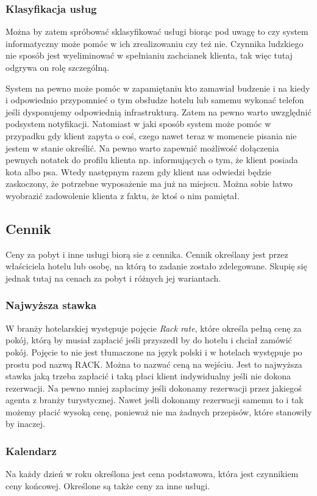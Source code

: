 \documentclass[12pt, a4paper]{article}
\begin{document}
\subsubsection{Klasyfikacja usług}
Można by zatem spróbować sklasyfikować usługi biorąc pod uwagę to czy system
informatyczny może pomóc w ich zrealizowaniu czy też nie. Czynnika ludzkiego
nie sposób jest wyeliminować w spełnianiu zachcianek klienta, tak więc tutaj
odgrywa on rolę szczególną.

System na pewno może pomóc w zapamiętaniu kto zamawiał budzenie i na kiedy i
odpowiednio przypomnieć o tym obsłudze hotelu lub samemu wykonać telefon jeśli
dysponujemy odpowiednią infrastrukturą. Zatem na pewno warto uwzględnić
podsystem notyfikacji. Natomiast w jaki sposób system może pomóc w przypadku gdy
klient zapyta o coś, czego nawet teraz w momencie pisania nie jestem w stanie
określić. Na pewno warto zapewnić możliwość dołączenia pewnych notatek do
profilu klienta np. informujących o tym, że klient posiada kota albo psa. Wtedy
następnym razem gdy klient nas odwiedzi będzie zaskoczony, że potrzebne
wyposażenie ma już na miejscu. Można sobie łatwo wyobrazić zadowolenie klienta z
faktu, że ktoś o nim pamiętał. 

\subsection{Cennik}
Ceny za pobyt i inne usługi biorą sie z cennika. Cennik określany jest przez
właściciela hotelu lub osobę, na którą to zadanie zostało zdelegowane. Skupię
się jednak tutaj na cenach za pobyt i różnych jej wariantach.

\subsubsection{Najwyższa stawka}
W branży hotelarskiej występuje pojęcie \emph{Rack rate}, które określa pełną
cenę za pokój, którą by musiał zapłacić jeśli przyszedł by do hotelu i chciał zamówić pokój.
Pojęcie to nie jest tłumaczone na język polski i w hotelach występuje po prostu
pod nazwą RACK. Można to nazwać ceną na wejściu. Jest to najwyższa stawka jaką
trzeba zapłacić i taką płaci klient indywidualny jeśli nie dokona rezerwacji. Na
pewno mniej zapłacimy jeśli dokonamy rezerwacji przez jakiegoś agenta z branży turystycznej.
Nawet jeśli dokonamy rezerwacji samemu to i tak możemy płacić wysoką cenę,
ponieważ nie ma żadnych przepisów, które stanowiły by inaczej.

\subsubsection{Kalendarz}
Na każdy dzień w roku określona jest cena podstawowa, która jest czynnikiem ceny
końcowej. Określone są także ceny za inne usługi.
\end{document}
